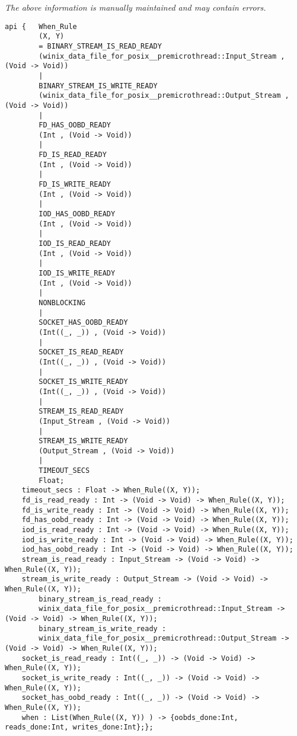 \label{api:When}

{\tiny \it The above information is manually maintained and may contain errors.}
\begin{verbatim}
api {   When_Rule
        (X, Y)
        = BINARY_STREAM_IS_READ_READY
        (winix_data_file_for_posix__premicrothread::Input_Stream , (Void -> Void))
        |
        BINARY_STREAM_IS_WRITE_READY
        (winix_data_file_for_posix__premicrothread::Output_Stream , (Void -> Void))
        |
        FD_HAS_OOBD_READY
        (Int , (Void -> Void))
        |
        FD_IS_READ_READY
        (Int , (Void -> Void))
        |
        FD_IS_WRITE_READY
        (Int , (Void -> Void))
        |
        IOD_HAS_OOBD_READY
        (Int , (Void -> Void))
        |
        IOD_IS_READ_READY
        (Int , (Void -> Void))
        |
        IOD_IS_WRITE_READY
        (Int , (Void -> Void))
        |
        NONBLOCKING
        |
        SOCKET_HAS_OOBD_READY
        (Int((_, _)) , (Void -> Void))
        |
        SOCKET_IS_READ_READY
        (Int((_, _)) , (Void -> Void))
        |
        SOCKET_IS_WRITE_READY
        (Int((_, _)) , (Void -> Void))
        |
        STREAM_IS_READ_READY
        (Input_Stream , (Void -> Void))
        |
        STREAM_IS_WRITE_READY
        (Output_Stream , (Void -> Void))
        |
        TIMEOUT_SECS
        Float;
    timeout_secs : Float -> When_Rule((X, Y));
    fd_is_read_ready : Int -> (Void -> Void) -> When_Rule((X, Y));
    fd_is_write_ready : Int -> (Void -> Void) -> When_Rule((X, Y));
    fd_has_oobd_ready : Int -> (Void -> Void) -> When_Rule((X, Y));
    iod_is_read_ready : Int -> (Void -> Void) -> When_Rule((X, Y));
    iod_is_write_ready : Int -> (Void -> Void) -> When_Rule((X, Y));
    iod_has_oobd_ready : Int -> (Void -> Void) -> When_Rule((X, Y));
    stream_is_read_ready : Input_Stream -> (Void -> Void) -> When_Rule((X, Y));
    stream_is_write_ready : Output_Stream -> (Void -> Void) -> When_Rule((X, Y));
        binary_stream_is_read_ready :
        winix_data_file_for_posix__premicrothread::Input_Stream -> (Void -> Void) -> When_Rule((X, Y));
        binary_stream_is_write_ready :
        winix_data_file_for_posix__premicrothread::Output_Stream -> (Void -> Void) -> When_Rule((X, Y));
    socket_is_read_ready : Int((_, _)) -> (Void -> Void) -> When_Rule((X, Y));
    socket_is_write_ready : Int((_, _)) -> (Void -> Void) -> When_Rule((X, Y));
    socket_has_oobd_ready : Int((_, _)) -> (Void -> Void) -> When_Rule((X, Y));
    when : List(When_Rule((X, Y)) ) -> {oobds_done:Int, reads_done:Int, writes_done:Int};};
\end{verbatim}

